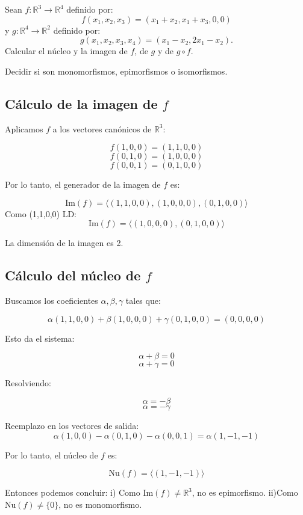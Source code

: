 \begin{enunciado}{\ejercicio}
    Sean \( f: \mathbb{R}^3 \to \mathbb{R}^4 \) definido por:
    \[
    f(x_1, x_2, x_3) = (x_1 + x_2, x_1 + x_3, 0, 0)
    \]
    y \( g: \mathbb{R}^4 \to \mathbb{R}^2 \) definido por:
    \[
    g(x_1, x_2, x_3, x_4) = (x_1 - x_2, 2x_1 - x_2).
    \]
    Calcular el núcleo y la imagen de \( f \), de \( g \) y de \( g \circ f \).  
    
    Decidir si son monomorfismos, epimorfismos o isomorfismos.
\end{enunciado}

\subsection*{Cálculo de la imagen de \( f \)}

Aplicamos \( f \) a los vectores canónicos de \( \mathbb{R}^3 \):

\[ f(1,0,0) = (1,1,0,0) \]
\[ f(0,1,0) = (1,0,0,0) \]
\[ f(0,0,1) = (0,1,0,0) \]

Por lo tanto, el generador de la imagen de \( f \) es:

\[ \text{Im}(f) = \langle (1,1,0,0), (1,0,0,0), (0,1,0,0) \rangle \]
Como (1,1,0,0) LD:
\[ \text{Im}(f) = \langle  (1,0,0,0), (0,1,0,0) \rangle \]


La dimensión de la imagen es 2.

\subsection*{Cálculo del núcleo de \( f \)}

Buscamos los coeficientes \( \alpha, \beta, \gamma \) tales que:

\[ \alpha(1,1,0,0) + \beta(1,0,0,0) + \gamma(0,1,0,0) = (0,0,0,0) \]

Esto da el sistema:

\[ \alpha + \beta = 0 \]
\[ \alpha + \gamma = 0 \]

Resolviendo:

\[ \alpha = -\beta \]
\[ \alpha = -\gamma \]

Reemplazo en los vectores de salida:
\[ \alpha(1,0,0) - \alpha(0,1,0) - \alpha(0,0,1) = \alpha(1,-1,-1) \]


Por lo tanto, el núcleo de \( f \) es:

\[ \text{Nu}(f) = \langle (1,-1,-1) \rangle \]


Entonces podemos concluir:
\newline
i) Como \( \text{Im}(f) \neq \mathbb{R}^3 \), no es epimorfismo.
\newline
ii)Como \( \text{Nu}(f) \neq \{0\} \), no es monomorfismo.

